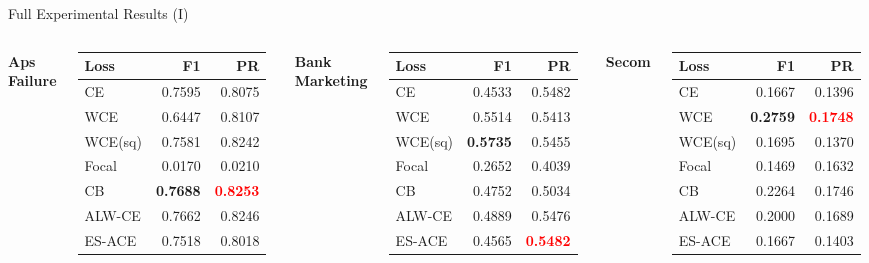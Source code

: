 \documentclass[aspectratio=169]{beamer}
\renewcommand{\textbf}[1]{\textcolor{SejongBlue}{\sf\bfseries #1}}
\begin{document}
\begin{frame}{Full Experimental Results (I)}
\begin{columns}[T, totalwidth=\textwidth]
\textbf{Aps Failure}
\begin{tabular}{lrr}
\toprule
Loss & F1 & PR \\
\midrule
CE & 0.7595 & 0.8075 \\
WCE & 0.6447 & 0.8107 \\
WCE(sq) & 0.7581 & 0.8242 \\
Focal & 0.0170 & 0.0210 \\
CB & \textcolor{SejongBlue}{\textbf{0.7688}} & \textcolor{red}{\textbf{0.8253}} \\
\textcolor{SejongBlue}{ALW-CE} & 0.7662 & 0.8246 \\
\textcolor{SejongBlue}{ES-ACE} & 0.7518 & 0.8018 \\
\bottomrule
\end{tabular}

\vspace{0.8em}

\textbf{Bank Marketing}
\begin{tabular}{lrr}
\toprule
Loss & F1 & PR \\
\midrule
CE & 0.4533 & 0.5482 \\
WCE & 0.5514 & 0.5413 \\
WCE(sq) & \textcolor{SejongBlue}{\textbf{0.5735}} & 0.5455 \\
Focal & 0.2652 & 0.4039 \\
CB & 0.4752 & 0.5034 \\
\textcolor{SejongBlue}{ALW-CE} & 0.4889 & 0.5476 \\
\textcolor{SejongBlue}{ES-ACE} & 0.4565 & \textcolor{red}{\textbf{0.5482}} \\
\bottomrule
\end{tabular}


\textbf{Secom}
\begin{tabular}{lrr}
\toprule
Loss & F1 & PR \\
\midrule
CE & 0.1667 & 0.1396 \\
WCE & \textcolor{SejongBlue}{\textbf{0.2759}} & \textcolor{red}{\textbf{0.1748}} \\
WCE(sq) & 0.1695 & 0.1370 \\
Focal & 0.1469 & 0.1632 \\
CB & 0.2264 & 0.1746 \\
\textcolor{SejongBlue}{ALW-CE} & 0.2000 & 0.1689 \\
\textcolor{SejongBlue}{ES-ACE} & 0.1667 & 0.1403 \\
\bottomrule
\end{tabular}


\end{columns}
\end{frame}
\end{document}
